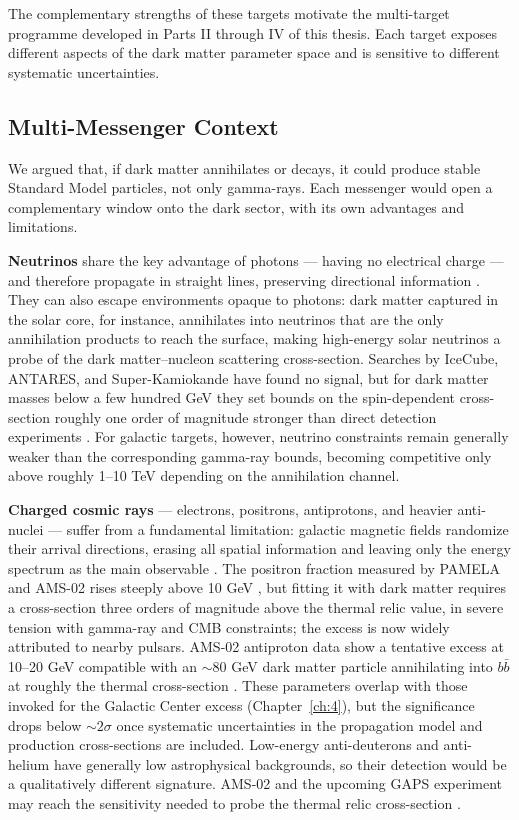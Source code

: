 The complementary strengths of these targets motivate the multi-target programme developed in Parts II through IV of this thesis.
Each target exposes different aspects of the dark matter parameter space and is sensitive to different systematic uncertainties.

\subsection{Multi-Messenger Context}
\label{sec:multi_messenger}

We argued that, if dark matter annihilates or decays, it could produce stable Standard Model particles, not only gamma-rays.
Each messenger would open a complementary window onto the dark sector, with its own advantages and limitations.

\textbf{Neutrinos} share the key advantage of photons --- having no electrical charge --- and therefore propagate in straight lines, preserving directional information \cite{Cirelli:2024ssz}.
They can also escape environments opaque to photons: dark matter captured in the solar core, for instance, annihilates into neutrinos that are the only annihilation products to reach the surface, making high-energy solar neutrinos a probe of the dark matter--nucleon scattering cross-section.
Searches by IceCube, ANTARES, and Super-Kamiokande have found no signal, but for dark matter masses below a few hundred GeV they set bounds on the spin-dependent cross-section roughly one order of magnitude stronger than direct detection experiments \cite{IceCube:2016dgk}.
For galactic targets, however, neutrino constraints remain generally weaker than the corresponding gamma-ray bounds, becoming competitive only above roughly 1--10 TeV depending on the annihilation channel.

\textbf{Charged cosmic rays} --- electrons, positrons, antiprotons, and heavier anti-nuclei --- suffer from a fundamental limitation: galactic magnetic fields randomize their arrival directions, erasing all spatial information and leaving only the energy spectrum as the main observable \cite{Cirelli:2024ssz,Pinetti:2021jjs}.
The positron fraction measured by PAMELA and AMS-02 rises steeply above 10 GeV \cite{PAMELA:2008gwm}, but fitting it with dark matter requires a cross-section three orders of magnitude above the thermal relic value, in severe tension with gamma-ray and CMB constraints; the excess is now widely attributed to nearby pulsars.
AMS-02 antiproton data show a tentative excess at 10--20 GeV compatible with an $\sim$80 GeV dark matter particle annihilating into $b\bar{b}$ at roughly the thermal cross-section \cite{Cuoco:2016eej}.
These parameters overlap with those invoked for the Galactic Center excess (Chapter~\ref{ch:4}), but the significance drops below $\sim 2\sigma$ once systematic uncertainties in the propagation model and production cross-sections are included.
Low-energy anti-deuterons and anti-helium have generally low astrophysical backgrounds, so their detection would be a qualitatively different signature.
AMS-02 and the upcoming GAPS experiment may reach the sensitivity needed to probe the thermal relic cross-section \cite{Hooper:2024}.

